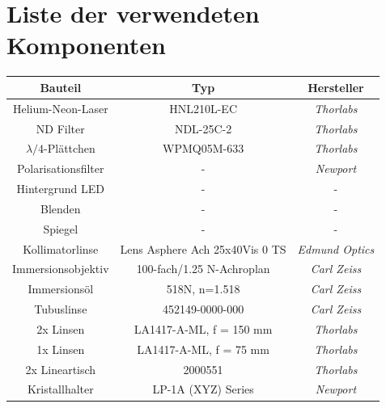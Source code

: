 \documentclass[titlepage]{article}
\begin{document}
	\section{Liste der verwendeten Komponenten}
	\begin{table}[h!]
		\centering	
		\label{tab:components}
		\begin{tabular}{|c|c|c|}
			\hline
			\textbf{Bauteil}         & \textbf{Typ}                   & \textbf{Hersteller}                    \\
			\hline
			\hline
			Helium-Neon-Laser        & HNL210L-EC                     & \textit{Thorlabs}                      \\
			ND Filter                & NDL-25C-2                      & \textit{Thorlabs}                      \\
			$\lambda/4$-Plättchen    & WPMQ05M-633                    & \textit{Thorlabs}                      \\
			Polarisationsfilter      & -        					  & \textit{Newport}                       \\
			Hintergrund LED          & -          					  & -                  					   \\
			Blenden                  & -          					  & -                  					   \\
			Spiegel                  & -          					  & -                  					   \\
			Kollimatorlinse          & Lens Asphere Ach 25x40Vis 0 TS & \textit{Edmund Optics}                 \\
			Immersionsobjektiv       & 100-fach/1.25 N-Achroplan      & \textit{Carl Zeiss}                    \\
			Immersionsöl             & 518N, n=1.518                  & \textit{Carl Zeiss}                    \\
			Tubuslinse               & 452149-0000-000                & \textit{Carl Zeiss}                    \\
			2x Linsen                & LA1417-A-ML, f = 150 mm        & \textit{Thorlabs}                      \\
			1x Linsen                & LA1417-A-ML, f = 75 mm         & \textit{Thorlabs}                      \\
			2x Lineartisch           & 2000551						  &\textit{Thorlabs} 					   \\
			Kristallhalter           & LP-1A (XYZ) Series             & \textit{Newport}                       \\

\end{tabular}
\end{table}
\end{document}
